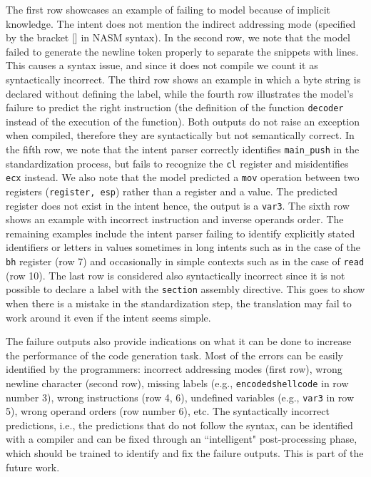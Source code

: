 The first row showcases an example of failing to model because of implicit knowledge. The intent does not mention the indirect addressing mode (specified by the bracket [] in NASM syntax). 
In the second row, we note that the model failed to generate the newline token properly to separate the snippets with lines. This causes a syntax issue, and since it does not compile we count it as syntactically incorrect.
The third row shows an example in which a byte string is declared without defining the label, while the fourth row illustrates the model's failure to predict the right instruction (the definition of the function \texttt{decoder} instead of the execution of the function). Both outputs do not raise an exception when compiled, therefore they are syntactically but not semantically correct.
In the fifth row, we note that the intent parser correctly identifies \texttt{main\_push} in the standardization process, but fails to recognize the \texttt{cl} register and misidentifies \texttt{ecx} instead. We also note that the model predicted a \texttt{mov} operation between two registers (\texttt{register, esp}) rather than a register and a value.  The predicted register does not exist in the intent hence, the output is a \texttt{var3}. 
The sixth row shows an example with incorrect instruction and inverse operands order.
The remaining examples include the intent parser failing to identify explicitly stated identifiers or letters in values sometimes in long intents such as in the case of the \texttt{bh} register (row 7) and occasionally in simple contexts such as in the case of \texttt{read} (row 10). The last row is considered also syntactically incorrect since it is not possible to declare a label with the \texttt{section} assembly directive. 
This goes to show when there is a mistake in the standardization step, the translation may fail to work around it even if the intent seems simple.



The failure outputs also provide indications on what it can be done to increase the performance of the code generation task. Most of the errors can be easily identified by the programmers: incorrect addressing modes (first row),  wrong newline character (second row), missing labels (e.g., \texttt{encodedshellcode} in row number 3), wrong instructions (row 4, 6), undefined variables (e.g., \texttt{var3} in row 5), wrong operand orders (row number 6), etc.
The syntactically incorrect predictions, i.e., the predictions that do not follow the syntax, can be identified with a compiler and can be fixed through an ``intelligent" post-processing phase, which should be trained to identify and fix the failure outputs. This is part of the future work.




